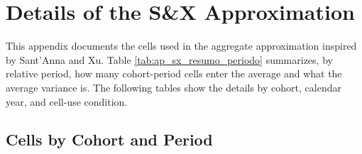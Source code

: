 \section{Details of the S\&X Approximation} \label{ap:sx}

This appendix documents the cells used in the aggregate approximation inspired by Sant'Anna and Xu. Table \ref{tab:ap_sx_resumo_periodo} summarizes, by relative period, how many cohort-period cells enter the average and what the average variance is. The following tables show the details by cohort, calendar year, and cell-use condition.



\subsection{Cells by Cohort and Period}






